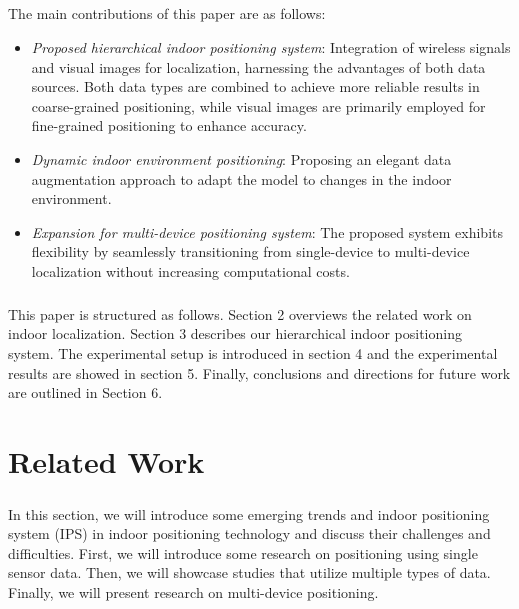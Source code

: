 \documentclass[a4paper,12pt]{report}
\begin{document}
\paragraph{}
The main contributions of this paper are as follows:
\begin{itemize}
    \item \emph{Proposed hierarchical indoor positioning system}: Integration of wireless signals and visual images for localization, harnessing the advantages of both data sources. Both data types are combined to achieve more reliable results in coarse-grained positioning, while visual images are primarily employed for fine-grained positioning to enhance accuracy.
    \item \emph{Dynamic indoor environment positioning}: Proposing an elegant data augmentation approach to adapt the model to changes in the indoor environment.
    \item \emph{Expansion for multi-device positioning system}: The proposed system exhibits flexibility by seamlessly transitioning from single-device to multi-device localization without increasing computational costs.
\end{itemize}
\paragraph{} %
This paper is structured as follows. Section 2 overviews
the related work on indoor localization. Section 3 describes our hierarchical indoor positioning system. The experimental setup is introduced in section 4 and the experimental results are showed in section 5. Finally, conclusions and directions for future work are outlined in Section 6.


\chapter{Related Work}
\paragraph{}
In this section, we will introduce some emerging trends and indoor positioning system (IPS) in indoor positioning technology and discuss their challenges and difficulties. First, we will introduce some research on positioning using single sensor data. Then, we will showcase studies that utilize multiple types of data. Finally, we will present research on multi-device positioning.
\end{document}
